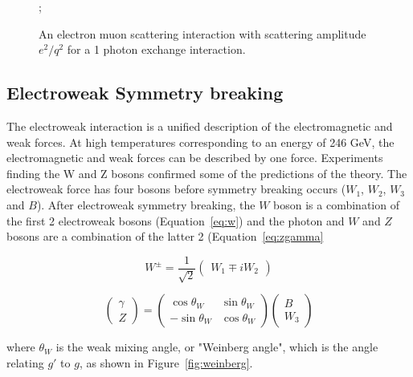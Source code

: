 \begin{figure}
	\centering
	;
	\caption{An electron muon scattering interaction with scattering amplitude $e^2/q^2$ for a 1 photon exchange interaction.}
\end{figure}

\subsection{Electroweak Symmetry breaking}

The electroweak interaction is a unified description of the electromagnetic and weak forces. At high temperatures corresponding to an energy of 246 GeV, the electromagnetic and weak forces can be described by one force. Experiments finding the W and Z bosons confirmed some of the predictions of the theory. The electroweak force has four bosons before symmetry breaking occurs ($W_1$, $W_2$, $W_3$ and $B$). After electroweak symmetry breaking, the $W$ boson is a combination of the first 2 electroweak bosons (Equation~\ref{eq:w}) and the photon and $W$ and $Z$ bosons are a combination of the latter 2 (Equation~\ref{eq:zgamma} 

\begin{equation}
	W^{\pm} = \frac{1}{\sqrt{2}}
	\begin{pmatrix}
		W_1 \mp iW_2
	\end{pmatrix}
	\label{eq:w}
\end{equation}


\begin{equation}
	\begin{pmatrix}
		\gamma \\
		Z 
	\end{pmatrix} = \begin{pmatrix}
		\cos{\theta_W} & \sin{\theta_W} \\
		-\sin{\theta_W} & \cos{\theta_W}
	\end{pmatrix}
	\begin{pmatrix}
		B \\
		W_3 
	\end{pmatrix}
	\label{eq:zgamma}
\end{equation}

where $\theta_W$ is the weak mixing angle, or "Weinberg angle", which is the angle relating $g'$ to $g$, as shown in Figure~\ref{fig:weinberg}.


